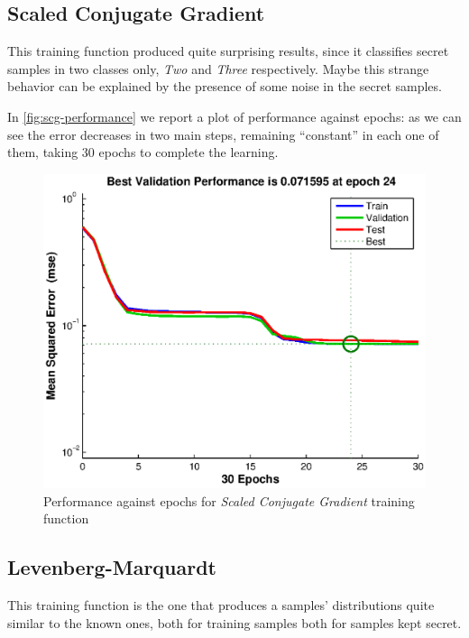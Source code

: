 \documentclass[10pt,a4paper]{article}
\begin{document}
    \subsection{Scaled Conjugate Gradient}

    This training function produced quite surprising results, since it classifies secret
    samples in two classes only, \emph{Two} and \emph{Three} respectively. Maybe this strange behavior
    can be explained by the presence of some noise in the secret samples.

    In \autoref{fig:scg-performance} we report a plot of performance against epochs: as we can
    see the error decreases in two main steps, remaining ``constant'' in each one of them,
     taking $30$ epochs to complete the learning.

    \begin{figure}
    \centering
    \includegraphics[scale=0.7]{eps/scg-performance.eps}
    \caption{Performance against epochs for \emph{Scaled Conjugate Gradient} training function}
    \label{fig:scg-performance}
    \end{figure}

    \subsection{Levenberg-Marquardt}

    This training function is the one that produces a samples' distributions quite similar 
    to the known ones, both for training samples both for samples kept secret. 
\end{document}
